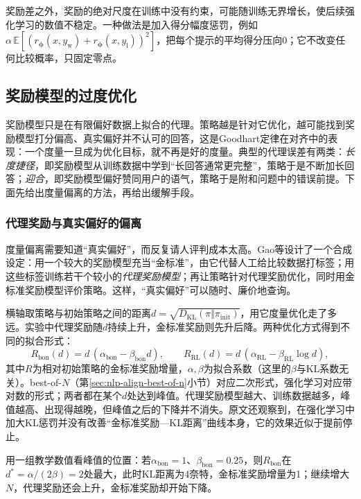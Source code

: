 奖励差之外，奖励的绝对尺度在训练中没有约束，可能随训练无界增长，使后续强化学习的数值不稳定。一种做法是加入得分幅度惩罚，例如$\alpha\,\mathbb E[(r_{\bm\phi}(x,y_{\mathrm w})+r_{\bm\phi}(x,y_{\mathrm l}))^2]$，把每个提示的平均得分压向0；它不改变任何比较概率，只固定零点。

\subsection{奖励模型的过度优化}
\label{sec:nlp-align-overoptimization}

奖励模型只是在有限偏好数据上拟合的代理。策略越是针对它优化，越可能找到奖励模型打分偏高、真实偏好并不认可的回答，这是Goodhart定律在对齐中的表现：一个度量一旦成为优化目标，就不再是好的度量。典型的代理误差有两类：\emph{长度捷径}，即奖励模型从训练数据中学到“长回答通常更完整”，策略于是不断加长回答；\emph{迎合}，即奖励模型偏好赞同用户的语气，策略于是附和问题中的错误前提。下面先给出度量偏离的方法，再给出缓解手段。

\subsubsection{代理奖励与真实偏好的偏离}
\label{sec:nlp-align-proxy-gold}

度量偏离需要知道“真实偏好”，而反复请人评判成本太高。Gao等设计了一个合成设定\cite{gao2022overoptimization}：用一个较大的奖励模型充当“金标准”，由它代替人工给比较数据打标签；用这些标签训练若干个较小的\emph{代理奖励模型}；再让策略针对代理奖励优化，同时用金标准奖励模型评价策略。这样，“真实偏好”可以随时、廉价地查询。

横轴取策略与初始策略之间的距离$d=\sqrt{D_{\mathrm{KL}}(\pi\Vert\pi_{\mathrm{init}})}$，用它度量优化走了多远。实验中代理奖励随$d$持续上升，金标准奖励则先升后降。两种优化方式得到不同的拟合形式：
\begin{equation}
\label{eq:nlp-align-overopt-fit}
 R_{\mathrm{bon}}(d)=d\,(\alpha_{\mathrm{bon}}-\beta_{\mathrm{bon}}d),\qquad
 R_{\mathrm{RL}}(d)=d\,(\alpha_{\mathrm{RL}}-\beta_{\mathrm{RL}}\log d),
\end{equation}
其中$R$为相对初始策略的金标准奖励增量，$\alpha,\beta$为拟合系数（这里的$\beta$与KL系数无关）。best-of-$N$（第\ref{sec:nlp-align-best-of-n}小节）对应二次形式，强化学习对应带对数的形式；两者都在某个$d$处达到峰值。代理奖励模型越大、训练数据越多，峰值越高、出现得越晚，但峰值之后的下降并不消失。原文还观察到，在强化学习中加大KL惩罚并没有改善“金标准奖励—KL距离”曲线本身，它的效果近似于提前停止。

用一组教学数值看峰值的位置：若$\alpha_{\mathrm{bon}}=1$、$\beta_{\mathrm{bon}}=0.25$，则$R_{\mathrm{bon}}$在$d^*=\alpha/(2\beta)=2$处最大，此时KL距离为4奈特，金标准奖励增量为1；继续增大$N$，代理奖励还会上升，金标准奖励却开始下降。

